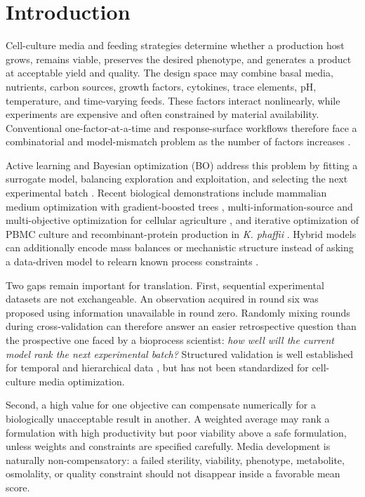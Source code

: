 \documentclass[11pt]{article}
\newcommand{\kp}{\textit{K. phaffii}}
\begin{document}
\section{Introduction}
Cell-culture media and feeding strategies determine whether a production host grows, remains viable, preserves the desired phenotype, and generates a product at acceptable yield and quality. The design space may combine basal media, nutrients, carbon sources, growth factors, cytokines, trace elements, pH, temperature, and time-varying feeds. These factors interact nonlinearly, while experiments are expensive and often constrained by material availability. Conventional one-factor-at-a-time and response-surface workflows therefore face a combinatorial and model-mismatch problem as the number of factors increases \cite{zhou2023,combe2021}.

Active learning and Bayesian optimization (BO) address this problem by fitting a surrogate model, balancing exploration and exploitation, and selecting the next experimental batch \cite{rasmussen2006,jones1998,hie2020}. Recent biological demonstrations include mammalian medium optimization with gradient-boosted trees \cite{hashizume2023}, multi-information-source and multi-objective optimization for cellular agriculture \cite{cosenza2022,cosenza2023}, and iterative optimization of PBMC culture and recombinant-protein production in \kp{} \cite{narayanan2025}. Hybrid models can additionally encode mass balances or mechanistic structure instead of asking a data-driven model to relearn known process constraints \cite{raissi2019,cui2023}.

Two gaps remain important for translation. First, sequential experimental datasets are not exchangeable. An observation acquired in round six was proposed using information unavailable in round zero. Randomly mixing rounds during cross-validation can therefore answer an easier retrospective question than the prospective one faced by a bioprocess scientist: \emph{how well will the current model rank the next experimental batch?} Structured validation is well established for temporal and hierarchical data \cite{roberts2017,vabalas2019}, but has not been standardized for cell-culture media optimization.

Second, a high value for one objective can compensate numerically for a biologically unacceptable result in another. A weighted average may rank a formulation with high productivity but poor viability above a safe formulation, unless weights and constraints are specified carefully. Media development is naturally non-compensatory: a failed sterility, viability, phenotype, metabolite, osmolality, or quality constraint should not disappear inside a favorable mean score.
\end{document}
